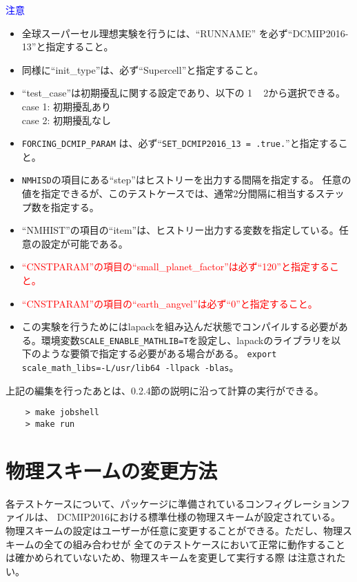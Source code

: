  \noindent \textcolor{blue}{{\sf 注意}}
 \begin{itemize}
   \item 全球スーパーセル理想実験を行うには、``RUNNAME'' を必ず``DCMIP2016-13''と指定すること。
   \item 同様に``init\_type''は、必ず``Supercell''と指定すること。
   \item ``test\_case''は初期擾乱に関する設定であり、以下の 1 ~ 2から選択できる。\\
          case 1: 初期擾乱あり \\
          case 2: 初期擾乱なし
   \item \verb|FORCING_DCMIP_PARAM| は、必ず``\verb|SET_DCMIP2016_13 = .true.|''と指定すること。
   \item \verb|NMHISD|の項目にある``step''はヒストリーを出力する間隔を指定する。
           任意の値を指定できるが、このテストケースでは、通常2分間隔に相当するステップ数を指定する。
   \item ``NMHIST''の項目の``item''は、ヒストリー出力する変数を指定している。任意の設定が可能である。
   \item \textcolor{red}{``CNSTPARAM''の項目の``small\_planet\_factor''は必ず``120''と指定すること。}
   \item \textcolor{red}{``CNSTPARAM''の項目の``earth\_angvel''は必ず``0''と指定すること。}
   \item この実験を行うためにはlapackを組み込んだ状態でコンパイルする必要があ
     る。環境変数\verb|SCALE_ENABLE_MATHLIB=T|を設定し、lapackのライブラリを以
     下のような要領で指定する必要がある場合がある。
     \verb|export scale_math_libs=-L/usr/lib64 -llpack -blas|。
 \end{itemize}

 \noindent 上記の編集を行ったあとは、0.2.4節の説明に沿って計算の実行ができる。
 \begin{verbatim}
    > make jobshell
    > make run
 \end{verbatim}


\section{物理スキームの変更方法}

 \noindent 各テストケースについて、パッケージに準備されているコンフィグレーションファイルは、
DCMIP2016における標準仕様の物理スキームが設定されている。
物理スキームの設定はユーザーが任意に変更することができる。ただし、物理スキームの全ての組み合わせが
全てのテストケースにおいて正常に動作することは確かめられていないため、物理スキームを変更して実行する際
は注意されたい。\\


